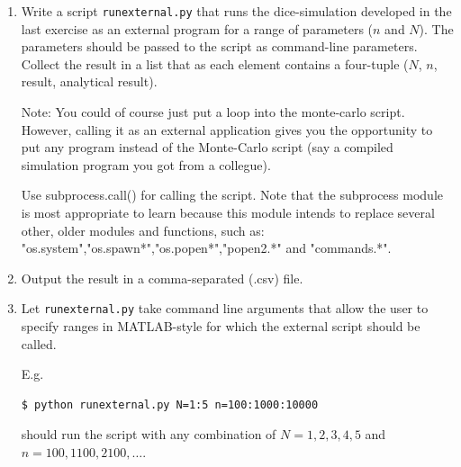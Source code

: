 \documentclass[smallheadings,12pt]{scrartcl}
\begin{document}
\begin{enumerate}
\item Write a script \texttt{runexternal.py} that runs the
  dice-simulation developed in the last exercise as an external
  program for a range of parameters ($n$ and $N$). The parameters
  should be passed to the script as command-line parameters. Collect
  the result in a list that as each element contains a four-tuple
  ($N$, $n$, result, analytical result).

  Note: You could of course just put a loop into the monte-carlo
  script. However, calling it as an external application gives you the
  opportunity to put any program instead of the Monte-Carlo script
  (say a compiled simulation program you got from a collegue).
  
  Use subprocess.call() for calling the script. Note that the subprocess module is most appropriate to learn because this module intends to replace several other, older modules and functions, such as: "os.system","os.spawn*","os.popen*","popen2.*" and "commands.*".

\item Output the result in a comma-separated (.csv) file.
\item Let {\tt runexternal.py} take command line arguments that allow
  the user to specify ranges in MATLAB-style for which the external
  script should be called.

  E.g. 
\begin{verbatim}
$ python runexternal.py N=1:5 n=100:1000:10000 
\end{verbatim}
should run the script with any combination of $N=1,2,3,4,5$ and
$n=100,1100,2100,\ldots$. 
 
\end{enumerate}
\end{document}
